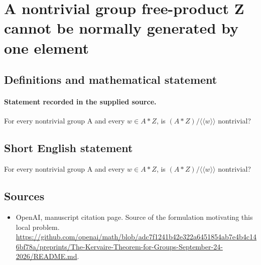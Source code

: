 \documentclass[11pt]{article}
\begin{document}
\section*{A nontrivial group free-product Z cannot be normally generated by one element}\label{statement}
\subsection{Definitions and mathematical statement}
\paragraph{Statement recorded in the supplied source.}
For every nontrivial group A and every $w\in A*Z$, is $(A*Z)/\langle \langle w\rangle \rangle $ nontrivial?
\subsection{Short English statement}
For every nontrivial group A and every $w\in A*Z$, is $(A*Z)/\langle \langle w\rangle \rangle $ nontrivial?
\subsection{Sources}
\begin{itemize}
\item[S1] OpenAI, manuscript citation page. Source of the formulation motivating this local problem.
\url{https://github.com/openai/math/blob/adc7f1241b42e322a6451854ab7e4b4c146bf78a/preprints/The-Kervaire-Theorem-for-Groups-September-24-2026/README.md}.
\end{itemize}
\end{document}
